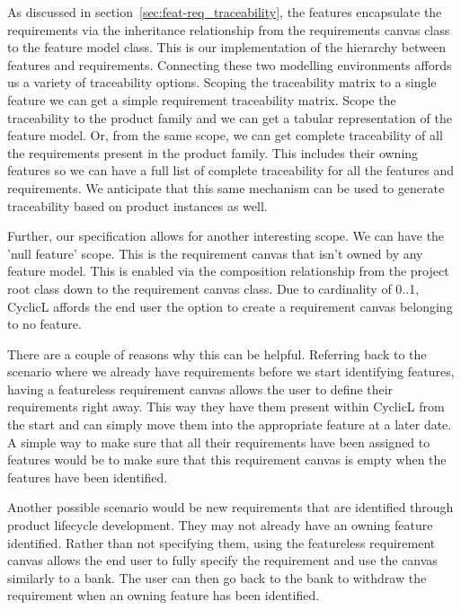 As discussed in section~\ref{sec:feat-req_traceability}, the features encapsulate the requirements via the inheritance relationship from the requirements canvas class to the feature model class. This is our implementation of the hierarchy between features and requirements. Connecting these two modelling environments affords us a variety of traceability options. Scoping the traceability matrix to a single feature we can get a simple requirement traceability matrix. Scope the traceability to the product family and we can get a tabular representation of the feature model. Or, from the same scope, we can get complete traceability of all the requirements present in the product family. This includes their owning features so we can have a full list of complete traceability for all the features and requirements. We anticipate that this same mechanism can be used to generate traceability based on product instances as well.

Further, our specification allows for another interesting scope. We can have the 'null feature' scope. This is the requirement canvas that isn't owned by any feature model. This is enabled via the composition relationship from the project root class down to the requirement canvas class. Due to cardinality of 0..1, CyclicL affords the end user the option to create a requirement canvas belonging to no feature. 

There are a couple of reasons why this can be helpful. Referring back to the scenario where we already have requirements before we start identifying features, having a featureless requirement canvas allows the user to define their requirements right away. This way they have them present within CyclicL from the start and can simply move them into the appropriate feature at a later date. A simple way to make sure that all their requirements have been assigned to features would be to make sure that this requirement canvas is empty when the features have been identified.

Another possible scenario would be new requirements that are identified through product lifecycle development. They may not already have an owning feature identified. Rather than not specifying them, using the featureless requirement canvas allows the end user to fully specify the requirement and use the canvas similarly to a bank. The user can then go back to the bank to withdraw the requirement when an owning feature has been identified. 


